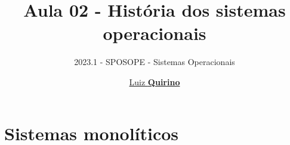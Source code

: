 \documentclass{beamer}
\title{Aula 02 - História dos sistemas operacionais}
\subtitle{2023.1 - SPOSOPE - Sistemas Operacionais}
\author{\href{mailto:luizfpq@gmail.com}{Luiz \textbf{Quirino}}}
\newcommand{\hrefcol}[2]{\textcolor{cyan}{\href{#1}{#2}}}
\begin{document}
\maketitle

%
%




\section{Sistemas monolíticos}
\end{document}
